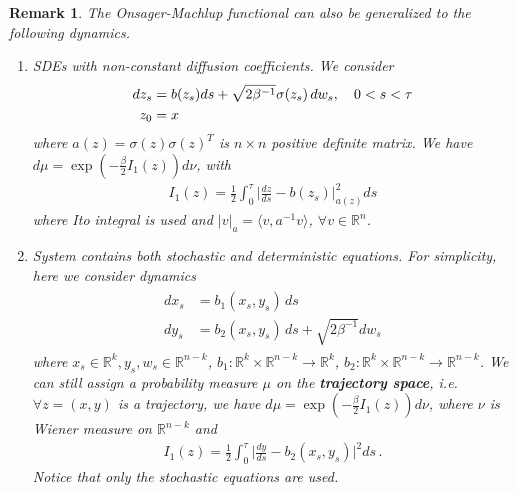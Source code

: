 \documentclass[final]{siamltex}
\newtheorem{remark}{Remark}
\begin{document}
\begin{remark}
  \label{remark-general}
  The Onsager-Machlup functional can also be generalized to the following dynamics.
  \begin{enumerate}
    \item
      SDEs with non-constant diffusion coefficients. We consider 
      \begin{align}
	\vspace{-9mm}
    \begin{split}
      d z_s &= b(z_s) ds + \sqrt{2\beta^{-1}} \sigma(z_s)\,dw_s, \quad 0 < s < \tau \\
      z_0&=x
    \end{split}
    \label{dynamics-1-sigma}
    \end{align}
    where $a(z) = \sigma(z)\sigma(z)^T$ is $n \times n$ positive definite matrix. We have 
    $d\mu = \exp(-\frac{\beta}{2} I_1(z)) d\nu$, with 
    \begin{align*}
      I_1(z) = \frac{1}{2} \int_0^\tau \Big|\frac{dz}{ds} -
      b(z_s)\Big|_{a(z)}^2 ds
    \end{align*}
     where Ito integral is used and $|v|_a = \langle v, a^{-1}v\rangle$,
     $\forall v \in \mathbb{R}^n$.
    \item
      System contains both stochastic and deterministic equations. For
      simplicity, here we consider dynamics 
      \begin{align}
      \begin{split}
	dx_s & = b_1(x_s, y_s)\, ds \\
	dy_s & = b_2(x_s, y_s)\, ds + \sqrt{2\beta^{-1}} dw_s
      \end{split}
      \label{ode-sde}
      \end{align}
      where $x_s \in \mathbb{R}^k, y_s, w_s \in \mathbb{R}^{n-k}$, $b_1 :
      \mathbb{R}^k \times \mathbb{R}^{n-k} \rightarrow \mathbb{R}^k$, $b_2 :
      \mathbb{R}^k \times \mathbb{R}^{n-k} \rightarrow
      \mathbb{R}^{n-k}$. We can still assign a probability measure $\mu$ on the
      \textbf{trajectory space}, i.e. $\forall z = (x,y) $ is a trajectory, we have 
      $d\mu = \exp(-\frac{\beta}{2} I_1(z)) d\nu$, where $\nu$ is Wiener
      measure on $\mathbb{R}^{n-k}$ and 
      \begin{align*}
	I_1(z) = \frac{1}{2} \int_0^\tau \Big|\frac{dy}{ds} - b_2(x_s, y_s)
	\Big|^2 ds\,.
      \end{align*}
      Notice that only the stochastic equations are used.
  \end{enumerate}
\end{remark}
\end{document}
